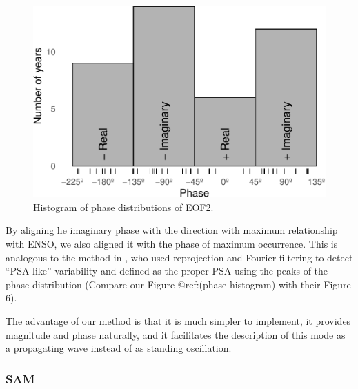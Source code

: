\documentclass[smallextended]{svjour3}       %
\begin{document}
\begin{figure}
\centering
\includegraphics{../figures/phase-histogram-1.pdf}
\caption{\label{fig:phase-histogram}Histogram of phase distributions of EOF2.}
\end{figure}

By aligning he imaginary phase with the direction with maximum relationship with ENSO, we also aligned it with the phase of maximum occurrence. This is analogous to the method in \citet{irving2016}, who used reprojection and Fourier filtering to detect ``PSA-like'' variability and defined as the proper PSA using the peaks of the phase distribution (Compare our Figure @ref:(phase-histogram) with their Figure 6).

The advantage of our method is that it is much simpler to implement, it provides magnitude and phase naturally, and it facilitates the description of this mode as a propagating wave instead of as standing oscillation.

\hypertarget{sam}{%
\subsubsection{SAM}\label{sam}}
\end{document}
